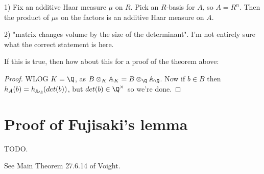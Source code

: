 1) Fix an additive Haar measure $\mu$ on $R$. Pick an $R$-basis for $A$, so $A=R^n$. Then
the product of $\mu$s on the factors is an additive Haar measure on $A$.

2) "matrix changes volume by the size of the determinant". I'm not entirely sure what
the correct statement is here.

If this is true, then how about this for a proof of the theorem above:

\begin{proof} WLOG $K=\Q$, as $B\otimes_K\mathbb{A}_K=B\otimes_{\Q}\mathbb{A}_{\Q}$.
  Now if $b\in B$ then $h_A(b)=h_{\mathbb{A}_{\Q}}(det(b))$, but $det(b)\in\Q^\times$
  so we're done.
\end{proof}

\section{Proof of Fujisaki's lemma}

TODO.

See Main Theorem 27.6.14 of Voight.
